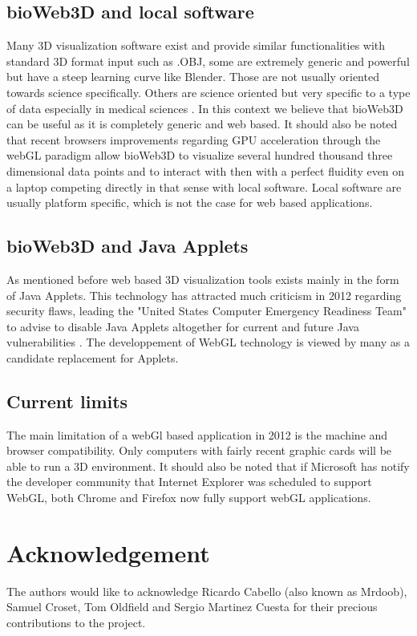 \documentclass{bioinfo}
\begin{document}
	\subsection{bioWeb3D and local software}
Many 3D visualization software exist and provide similar functionalities with standard 3D format input such as .OBJ, some are extremely generic and powerful but have a steep learning curve like Blender. Those are not usually oriented towards science specifically. Others are science oriented but very specific to a type of data especially in medical sciences \citep{Wang09}. In this context we believe that bioWeb3D can be useful as it is completely generic and web based. It should also be noted that recent browsers improvements regarding GPU acceleration through the webGL paradigm allow bioWeb3D to visualize several hundred thousand three dimensional data points and to interact with then with a perfect fluidity even on a laptop competing directly in that sense with local software. Local software are usually platform specific, which is not the case for web based applications.

	\subsection{bioWeb3D and Java Applets}
As mentioned before web based 3D visualization tools exists mainly in the form of Java Applets. This technology has attracted much criticism in 2012 regarding security flaws, leading the "United States Computer Emergency Readiness Team" to advise to disable Java Applets altogether for current and future Java vulnerabilities \citep{USCERT12}. The developpement of WebGL technology is viewed by many as a candidate replacement for Applets. 

	\subsection{Current limits}
The main limitation of a webGl based application in 2012 is the machine and browser compatibility. Only computers with fairly recent graphic cards will be able to run a 3D environment. It should also be noted that if Microsoft has notify the developer community that Internet Explorer was scheduled to support WebGL, both Chrome and Firefox now fully support webGL applications.



\section*{Acknowledgement}
The authors would like to acknowledge Ricardo Cabello (also known as Mrdoob), Samuel Croset, Tom Oldfield and Sergio Martinez Cuesta for their precious contributions to the project.
\end{document}

